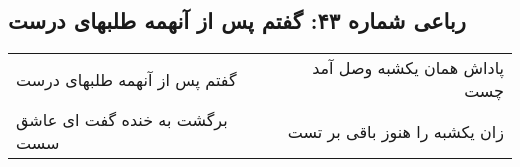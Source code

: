 \begin{center}
\section*{رباعی شماره ۴۳: گفتم پس از آنهمه طلبهای درست}
\label{sec:sh043}
\begin{longtable}{l p{0.5cm} r}
گفتم پس از آنهمه طلبهای درست
&&
پاداش همان یکشبه وصل آمد چست
\\
برگشت به خنده گفت ای عاشق سست
&&
زان یکشبه را هنوز باقی بر تست
\\
\end{longtable}
\end{center}
